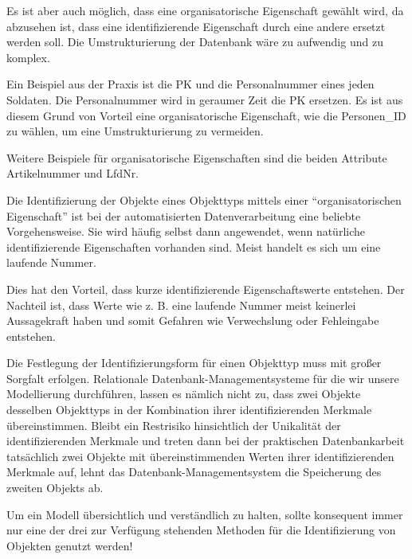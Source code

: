          Es ist aber auch möglich, dass eine organisatorische Eigenschaft
          gewählt wird, da abzusehen ist, dass eine identifizierende
          Eigenschaft durch eine andere ersetzt werden soll. Die
          Umstrukturierung der Datenbank wäre zu aufwendig und zu komplex.

          Ein Beispiel aus der Praxis ist die PK und die Personalnummer eines
          jeden Soldaten. Die Personalnummer wird in geraumer Zeit die PK
          ersetzen. Es ist aus diesem Grund von Vorteil eine organisatorische
          Eigenschaft, wie die Personen\_ID zu wählen, um eine
          Umstrukturierung zu vermeiden.

          Weitere Beispiele für organisatorische Eigenschaften sind die beiden Attribute Artikelnummer und LfdNr.

          Die Identifizierung der Objekte eines Objekttyps mittels einer
					\enquote{organisatorischen Eigenschaft} ist bei der automatisierten
					Datenverarbeitung eine beliebte Vorgehensweise. Sie wird häufig
					selbst dann angewendet, wenn natürliche identifizierende
					Eigenschaften vorhanden sind. Meist handelt es sich um eine laufende
					Nummer.

					Dies hat den Vorteil, dass kurze identifizierende Eigenschaftswerte
					entstehen. Der Nachteil ist, dass Werte wie z. B. eine laufende
					Nummer meist keinerlei Aussagekraft haben und somit Gefahren wie
					Verwechslung oder Fehleingabe entstehen.

					Die Festlegung der Identifizierungsform für einen Objekttyp muss mit
					großer Sorgfalt erfolgen. Relationale Datenbank-Managementsysteme
					für die wir unsere Modellierung durch\-füh\-ren, lassen es
					nämlich nicht zu, dass zwei Objekte desselben Objekttyps in der
					Kombination ihrer identifizierenden Merkmale übereinstimmen. Bleibt
					ein Restrisiko hinsichtlich der Unikalität der identifizierenden
					Merkmale und treten dann bei der praktischen Datenbankarbeit
					tatsächlich zwei Objekte mit übereinstimmenden Werten ihrer
					identifizierenden Merkmale auf, lehnt das Datenbank-Managementsystem
					die Speicherung des zweiten Objekts ab.

					\begin{merke}
						Um ein Modell übersichtlich und verständlich zu halten, sollte
						konsequent immer nur eine der drei zur Verfügung stehenden
						Methoden für die Identifizierung von Objekten genutzt werden!
					\end{merke}
